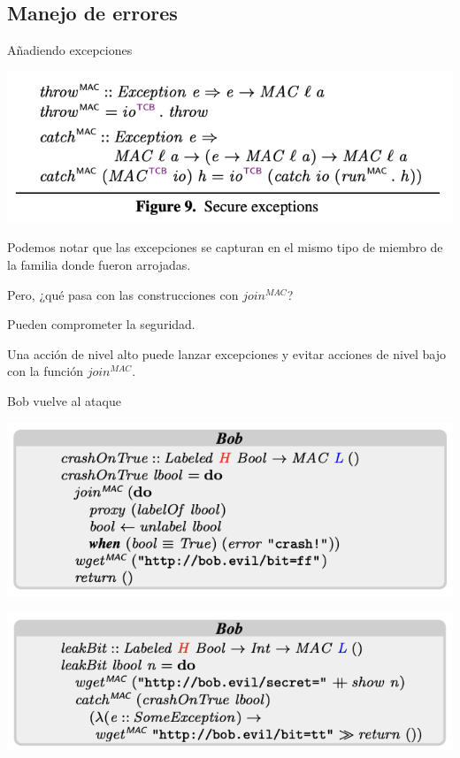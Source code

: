\documentclass{beamer}
\begin{document}
\subsection{Manejo de errores}

\begin{frame}{Añadiendo excepciones}
    \begin{center}
        \includegraphics[scale=0.7]{figure9.png}
    \end{center}

    Podemos notar que las excepciones se capturan en el mismo tipo de miembro de la familia donde fueron arrojadas.

    Pero, ¿qué pasa con las construcciones con $join^{MAC}$?
    
    Pueden comprometer la seguridad.
    
    Una acción de nivel alto puede lanzar excepciones y evitar acciones de nivel bajo con la función $join^{MAC}$.
\end{frame}

\begin{frame}{Bob vuelve al ataque}

    \begin{center}
        \includegraphics[scale=0.7]{codigo_bob2.png}
    \end{center}

    \begin{center}
        \includegraphics[scale=0.7]{codigo_bob3.png}
    \end{center}
\end{frame}
\end{document}
